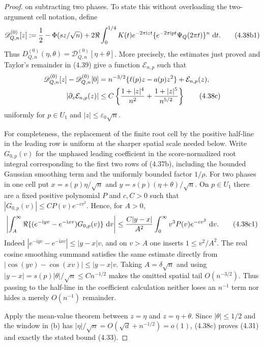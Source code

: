 \documentclass[11pt,a4paper]{article}
\numberwithin{equation}{section}
\theoremstyle{definition}
\theoremstyle{remark}
\newcommand{\ii}{\mathrm i}
\newcommand{\dd}{\,\mathrm d}
\begin{document}
\begin{proof}
on subtracting two phases.  To state this without overloading the
two-argument cell notation, define
\[
 \mathscr D^{(0)}_{Q,n}[z]:={1\over2}-\Phi(sz/\sqrt n)
 +2\Re\int_0^{1/4}K(t)e^{-2\pi\ii zt}
       \{e^{-2\pi\ii pt}\Psi_Q(2\pi t)\}^{n}\,\dd t .
                                                               \tag{4.38b1}
\]
Thus
$D^{(0)}_{Q,n}(\eta,\theta)=\mathscr D^{(0)}_{Q,n}[\eta+\theta]$.
More precisely, the estimates just proved and
Taylor's remainder in (4.39) give a function $\mathcal E_{n,p}$ such
that
\begin{align}
 \mathscr D^{(0)}_{Q,n}[z]-\mathscr D^{(0)}_{Q,n}[0]
 &=n^{-3/2}\{\ell(p)z-a(p)z^2\}+\mathcal E_{n,p}(z),\notag\\
 |\partial_z\mathcal E_{n,p}(z)|
 &\le C\left\{{1+|z|^4\over n^2}
                   +{1+|z|^5\over n^{5/2}}\right\}              \tag{4.38c}
\end{align}
uniformly for $p\in U_1$ and $|z|\le\varepsilon_0\sqrt n$.

For completeness, the replacement of the finite root cell by the positive
half-line in the leading row is uniform at the sharper spatial scale needed
below.  Write $G_{0,p}(v)$ for the unphased leading coefficient in the
score-normalized root integral corresponding to the first two rows of
(4.37b), including the bounded Gaussian smoothing term and the uniformly
bounded factor $1/\rho$.  For two phases in one cell put
$x=s(p)\eta/\sqrt n$ and $y=s(p)(\eta+\theta)/\sqrt n$.
On $p\in U_1$ there are a fixed positive polynomial $P$ and $c,C>0$ such
that $|G_{0,p}(v)|\le CP(v)e^{-cv^2}$.  Hence, for $A>0$,
\[
 \left|\int_A^\infty
   \Re\{(e^{-\ii yv}-e^{-\ii xv})G_{0,p}(v)\}\,\dd v\right|
 \le {C|y-x|\over A^2}
       \int_0^\infty v^3P(v)e^{-cv^2}\,\dd v .             \tag{4.38c1}
\]
Indeed $|e^{-\ii yv}-e^{-\ii xv}|\le |y-x|v$, and on $v>A$ one
inserts $1\le v^2/A^2$.  The real cosine smoothing summand satisfies the
same estimate directly from
$|\cos(yv)-\cos(xv)|\le |y-x|v$.  Taking
$A=\delta\sqrt n$ and using
$|y-x|=s(p)|\theta|/\sqrt n\le Cn^{-1/2}$ makes the omitted spatial tail
$O(n^{-3/2})$.
Thus passing to the half-line in the coefficient calculation neither loses
an $n^{-1}$ term nor hides a merely $O(n^{-1})$ remainder.

Apply the mean-value
theorem between $z=\eta$ and $z=\eta+\theta$.  Since
$|\theta|\le1/2$ and the window in (b) has
$|\eta|/\sqrt n=O(\sqrt d+n^{-1/2})=o(1)$, (4.38c) proves (4.31) and
exactly the stated bound (4.33).


\end{proof}
\end{document}
